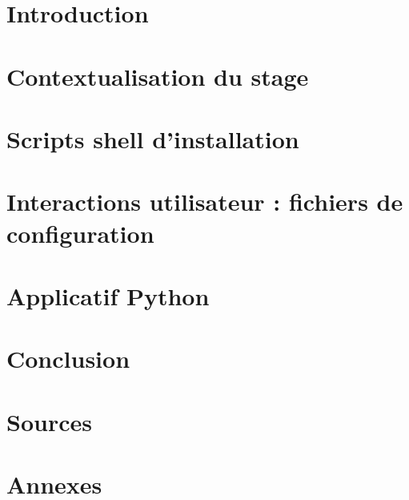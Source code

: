 \documentclass[french,12pt]{report}
\newcommand{\projectroot}{../../../..}
\newcommand{\rapportroot}{\projectroot/documents/out/rendus/rapport}
\newcommand{\rapportresroot}{\rapportroot/res}
\newcommand{\txtroot}{\rapportresroot/txt}
\newcommand{\blankpage}{
  \null
  \thispagestyle{empty}
  \clearpage
}
\begin{document}


\maketitle\clearpage
\blankpage





\chapter*{Introduction}
  

\chapter{Contextualisation du stage}
  

\chapter{Scripts shell d'installation}
  

\chapter{Interactions utilisateur : fichiers de configuration}
  

\chapter{Applicatif Python}
  

\chapter*{Conclusion}
  

\printglossaries\clearpage

\chapter*{Sources}
  

\chapter*{Annexes}
  
\end{document}
